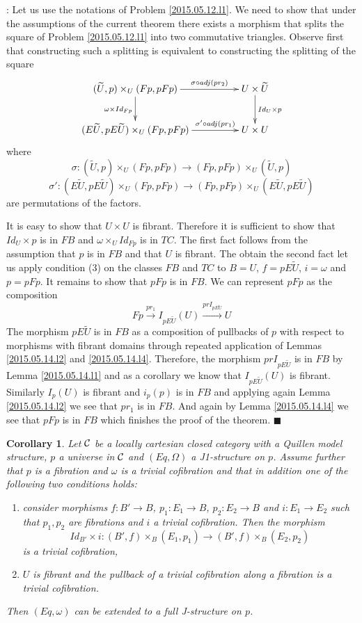 \documentclass[12pt]{article}
\numberwithin{equation}{section}
\newenvironment{myproof}{{\bf Proof}:}{$\blacksquare$ \vskip 5mm }
\newtheorem{cor}[proposition]{Corollary}
\newcommand{\llabel}[1]{\label{#1}}
\newcommand{\sr}{\rightarrow}
\newcommand{\wt}{\widetilde}
\begin{document}
\begin{myproof}
Let us use the notations of Problem \ref{2015.05.12.l1}. We need to show that
under the assumptions of the current theorem there exists a morphism that
splits the square of Problem \ref{2015.05.12.l1} into two commutative
triangles. Observe first that constructing such a splitting is equivalent to
constructing the splitting of the square
%
$$
\begin{xy}
          \xymatrix@C=4pc{ (\wt{U},p)\times_U (Fp,pFp) \ar[r]^-{\sigma\circ
              adj(pr_2)} \ar[d]_{\omega \times Id_{Fp}} & U\times\wt{U}
            \ar[d]^{Id_U\times p}\\ (E\wt{U},pE\wt{U})\times_U (Fp,pFp)
            \ar[r]^-{\sigma'\circ adj(pr_1)} & U\times U }
\end{xy}
$$
%
where
%
$$\sigma:(\wt{U},p)\times_U (Fp,pFp)\sr (Fp,pFp)\times_U (\wt{U},p)$$
$$\sigma':(E\wt{U},pE\wt{U})\times_U (Fp,pFp) \sr (Fp,pFp) \times_U
(E\wt{U},pE\wt{U})$$
%
are permutations of the factors.

It is easy to show that $U\times U$ is fibrant. Therefore it is sufficient to
show that $Id_U\times p$ is in $FB$ and $\omega\times_U Id_{Fp}$ is in
$TC$. The first fact follows from the assumption that $p$ is in $FB$ and that
$U$ is fibrant. The obtain the second fact let us apply condition (3) on the
classes $FB$ and $TC$ to $B=U$, $f=pE\wt{U}$, $i=\omega$ and $p=pFp$.  It
remains to show that $pFp$ is in $FB$. We can represent $pFp$ as the
composition
%
$$Fp\stackrel{pr_1}{\sr} I_{pE\wt{U}}(U) \stackrel{prI_{pE\wt{U}}}{\sr} U$$
%
The morphism $pE\wt{U}$ is in $FB$ as a composition of pullbacks of $p$ with
respect to morphisms with fibrant domains through repeated application of
Lemmas \ref{2015.05.14.l2} and \ref{2015.05.14.l4}. Therefore, the morphism
$prI_{pE\wt{U}}$ is in $FB$ by Lemma \ref{2015.05.14.l1} and as a corollary we
know that $I_{pE\wt{U}}(U)$ is fibrant. Similarly $I_p(U)$ is fibrant and
$i_p(p)$ is in $FB$ and applying again Lemma \ref{2015.05.14.l2} we see that
$pr_1$ is in $FB$. And again by Lemma \ref{2015.05.14.l4} we see that $pFp$ is
in $FB$ which finishes the proof of the theorem.
\end{myproof}
%
\begin{cor}
\llabel{2015.05.18.cor1} Let $\cal C$ be a locally cartesian closed category
with a Quillen model structure, $p$ a universe in $\cal C$ and $(Eq,\Omega)$ a
J1-structure on $p$. Assume further that $p$ is a fibration and $\omega$ is a
trivial cofibration and that in addition one of the following two conditions
holds:
%
\begin{enumerate}
\item consider morphisms $f: B'\sr B$, $p_1:E_1\sr B$, $p_2:E_2\sr B$ and
  $i:E_1\sr E_2$ such that $p_1,p_2$ are fibrations and $i$ a trivial
  cofibration. Then the morphism
%
$$Id_{B'}\times i: (B',f)\times_B(E_1,p_1)\sr (B',f)\times_B(E_2,p_2)$$
%
is a trivial cofibration,
%
\item $U$ is fibrant and the pullback of a trivial cofibration along a
  fibration is a trivial cofibration.
\end{enumerate}
%
Then $(Eq,\omega)$ can be extended to a full J-structure on $p$.
\end{cor}
%
\end{document}
